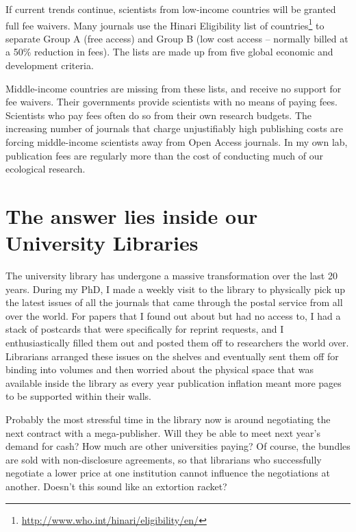 \documentclass[
]{krantz}
\renewcommand{\href}[2]{#2\footnote{\url{#1}}}
\begin{document}
If current trends continue, scientists from low-income countries will be granted full fee waivers. Many journals use the \href{http://www.who.int/hinari/eligibility/en/}{Hinari Eligibility list of countries} to separate Group A (free access) and Group B (low cost access -- normally billed at a 50\% reduction in fees). The lists are made up from five global economic and development criteria.

Middle-income countries are missing from these lists, and receive no support for fee waivers. Their governments provide scientists with no means of paying fees. Scientists who pay fees often do so from their own research budgets. The increasing number of journals that charge unjustifiably high publishing costs are forcing middle-income scientists away from Open Access journals. In my own lab, publication fees are regularly more than the cost of conducting much of our ecological research.

\hypertarget{the-answer-lies-inside-our-university-libraries}{%
\section{The answer lies inside our University Libraries}\label{the-answer-lies-inside-our-university-libraries}}

The university library has undergone a massive transformation over the last 20 years. During my PhD, I made a weekly visit to the library to physically pick up the latest issues of all the journals that came through the postal service from all over the world. For papers that I found out about but had no access to, I had a stack of postcards that were specifically for reprint requests, and I enthusiastically filled them out and posted them off to researchers the world over. Librarians arranged these issues on the shelves and eventually sent them off for binding into volumes and then worried about the physical space that was available inside the library as every year publication inflation \citep{lariviere2016how} meant more pages to be supported within their walls.

Probably the most stressful time in the library now is around negotiating the next contract with a mega-publisher. Will they be able to meet next year's demand for cash? How much are other universities paying? Of course, the bundles are sold with non-disclosure agreements, so that librarians who successfully negotiate a lower price at one institution cannot influence the negotiations at another. Doesn't this sound like an extortion racket?
\end{document}
